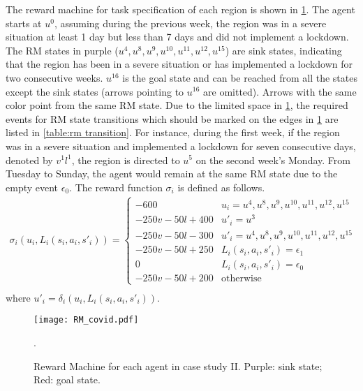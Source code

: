 \documentclass[conf]{new-aiaa}
\begin{document}
The reward machine for task specification of each region is shown in \cref{RM_covid}. The agent starts at $u^0$, assuming during the previous week, the region was in a severe situation at least 1 day but less than 7 days and did not implement a lockdown. The RM states in purple ($u^4, u^8, u^9, u^{10}, u^{11}, u^{12}, u^{15}$) are sink states, indicating that the region has been in a severe situation or has implemented a lockdown for two consecutive weeks. $u^{16}$ is the goal state and can be reached from all the states except the sink states (arrows pointing to $u^{16}$ are omitted). Arrows with the same color point from the same RM state. Due to the limited space in \cref{RM_covid},  the required events for RM state transitions which should be marked on the edges in \cref{RM_covid} are listed in \cref{table:rm transition}. For instance, during the first week, if the region was in a severe situation and implemented a lockdown for seven consecutive days, denoted by $v^1l^1$, the region is directed to $u^5$ on the second week's Monday. From Tuesday to Sunday, the agent would remain at the same RM state due to the empty event $\epsilon_0$. The reward function $\sigma_i$ is defined as follows.
\begin{equation}
    \begin{aligned}
        \sigma_i(u_i, L_i(s_i, a_i, s'_i)) 
         = \begin{cases}
                -600  & u_i=u^4, u^8, u^9, u^{10}, u^{11}, u^{12}, u^{15} \\
                -250v-50l+400  & u'_i=u^3 \\
                -250v-50l-300  & u'_i=u^4, u^8, u^9, u^{10}, u^{11}, u^{12}, u^{15}\\
                -250v-50l+250  & L_i(s_i, a_i, s'_i) = \epsilon_1 \\
                0 & L_i(s_i, a_i, s'_i) = \epsilon_0 \\
                -250v-50l+200  & \text{otherwise} 
           \end{cases} \\
    \end{aligned}
    \label{eq:covid_reward}
\end{equation}
where $u'_i = \delta_i(u_i, L_i(s_i, a_i, s'_i))$.

\begin{figure}[t]
\centering
\texttt{[image: RM\_covid.pdf]}
\caption{Reward Machine for each agent in case study II. Purple: sink state; Red: goal state.}.
\label{RM_covid}
\end{figure}
\end{document}
